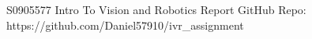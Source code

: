 \documentclass[8pt]{article}
\begin{document}
{\large
S0905577 Intro To Vision and Robotics Report
\newline
GitHub Repo:
\newline
https://github.com/Daniel57910/ivr\_assignment
}



\end{document}

